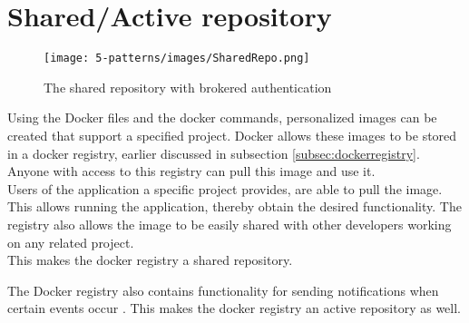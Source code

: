 \section{Shared/Active repository}
 \begin{figure}[H]
 \centering
 \texttt{[image: 5-patterns/images/SharedRepo.png]}
 \caption{The shared repository with brokered authentication}
 \label{fig:docker-registry}
 \end{figure}
Using the Docker files and the docker commands, personalized images can be created that support a specified project. Docker allows these images to be stored in a docker registry, earlier discussed in subsection \ref{subsec:dockerregistry}. Anyone with access to this registry can pull this image and use it.\\
Users of the application a specific project provides, are able to pull the image. This allows running the application, thereby obtain the desired functionality. The registry also allows the image to be easily shared with other developers working on any related project.\\
This makes the docker registry a shared repository.


The Docker registry also contains functionality for sending notifications when certain events occur \cite{docknotif}. This makes the docker registry an active repository as well.

